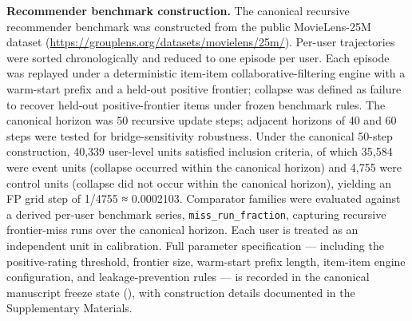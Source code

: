 \documentclass[
  11pt,
]{article}
\begin{document}
\textbf{Recommender benchmark construction.} The canonical recursive
recommender benchmark
\texttt{} was constructed
from the public MovieLens-25M dataset
(\url{https://grouplens.org/datasets/movielens/25m/}). Per-user
trajectories were sorted chronologically and reduced to one episode per
user. Each episode was replayed under a deterministic item-item
collaborative-filtering engine with a warm-start prefix and a held-out
positive frontier; collapse was defined as failure to recover held-out
positive-frontier items under frozen benchmark rules. The canonical
horizon was 50 recursive update steps; adjacent horizons of 40 and 60
steps were tested for bridge-sensitivity robustness. Under the canonical
50-step construction, 40,339 user-level units satisfied inclusion
criteria, of which 35,584 were event units (collapse occurred within the
canonical horizon) and 4,755 were control units (collapse did not occur
within the canonical horizon), yielding an FP grid step of 1/4755 ≈
0.0002103. Comparator families were evaluated against a derived per-user
benchmark series, \texttt{miss\_run\_fraction}, capturing recursive
frontier-miss runs over the canonical horizon. Each user is treated as
an independent unit in calibration. Full parameter specification ---
including the positive-rating threshold, frontier size, warm-start
prefix length, item-item engine configuration, and leakage-prevention
rules --- is recorded in the canonical manuscript freeze state
(\texttt{}),
with construction details documented in the Supplementary Materials.
\end{document}
